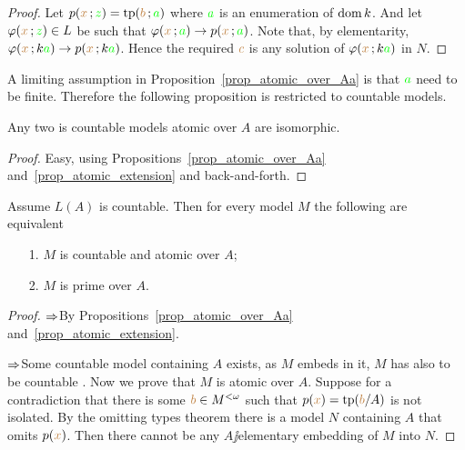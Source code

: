 \documentclass[creche.tex]{subfiles}
\begin{document}
\begin{proof}
Let $p({\color{brown} x}\,;{\color{green} z})={\rm tp}({\color{brown} b}\,;{\color{green} a})$ where ${\color{green} a}$ is an enumeration of $\mathop{\rm dom} k$. And let $\varphi({\color{brown} x}\,;{\color{green} z})\in L$ be such that $\varphi({\color{brown} x}\,;{\color{green} a})\rightarrow p({\color{brown} x}\,;{\color{green} a})$. Note that, by elementarity, $\varphi({\color{brown} x}\,;k{\color{green} a})\rightarrow p({\color{brown} x}\,;k{\color{green} a})$. Hence the required ${\color{brown} c}$ is any solution of $\varphi({\color{brown} x}\,;k{\color{green} a})$ in $N$. 
\end{proof}

A limiting assumption in Proposition~\ref{prop_atomic_over_Aa} is that ${\color{green} a}$ need to be finite. Therefore the following proposition is restricted to countable models.


\begin{proposition}\label{prop_atomic_unique}
Any two is countable models atomic over $A$ are isomorphic.
\end{proposition}

\begin{proof}
Easy, using Propositions~\ref{prop_atomic_over_Aa} and~\ref{prop_atomic_extension} and back-and-forth.
\end{proof}

\begin{proposition} 
Assume $L(A)$ is countable. Then for every model $M$ the following are equivalent
\begin{itemize}
\item[1.] $M$ is countable and atomic over $A$;
\item[2.] $M$ is prime over $A$.
\end{itemize}
\end{proposition}

\begin{proof}
$\Rightarrow$\quad By Propositions~\ref{prop_atomic_over_Aa} and~\ref{prop_atomic_extension}.


$\Rightarrow$\quad Some countable model containing $A$ exists, as $M$ embeds in it, $M$ has also to be countable . Now we prove that $M$ is atomic over $A$. Suppose for a contradiction that there is some ${\color{brown} b}\in M^{<\omega}$ such that $p({\color{brown} x})={\rm tp}({\color{brown} b}/A)$ is not isolated. By the omitting types theorem there is a model $N$ containing $A$ that omits $p({\color{brown} x})$. Then there cannot be any $A\jj$elementary embedding of $M$ into $N$.
\end{proof}
\end{document}
